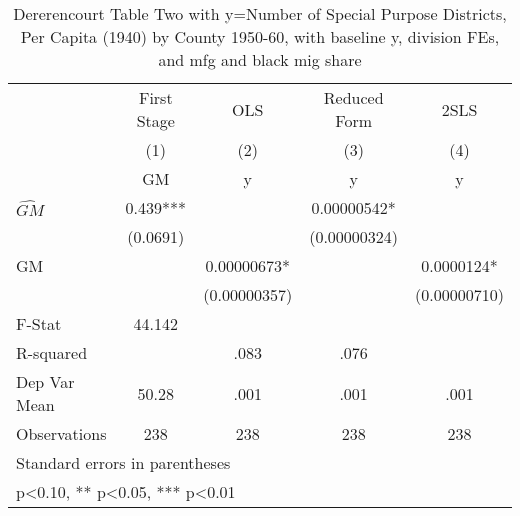 \begin{table}[htbp]\centering
\def\sym#1{\ifmmode^{#1}\else\(^{#1}\)\fi}
\caption{Dererencourt Table Two with y=Number of Special Purpose Districts, Per Capita (1940) by County 1950-60, with baseline y, division FEs, and mfg and black mig share}
\begin{tabular}{l*{4}{c}}
\toprule
                    & First Stage   &         OLS   &Reduced Form   &        2SLS   \\
                    &\multicolumn{1}{c}{(1)}&\multicolumn{1}{c}{(2)}&\multicolumn{1}{c}{(3)}&\multicolumn{1}{c}{(4)}\\
                    &\multicolumn{1}{c}{GM}&\multicolumn{1}{c}{y}&\multicolumn{1}{c}{y}&\multicolumn{1}{c}{y}\\
\midrule
$\hat{GM}$          &       0.439***&               &  0.00000542*  &               \\
                    &    (0.0691)   &               &(0.00000324)   &               \\
\addlinespace
GM                  &               &  0.00000673*  &               &   0.0000124*  \\
                    &               &(0.00000357)   &               &(0.00000710)   \\
\midrule
F-Stat              &      44.142   &               &               &               \\
R-squared           &               &        .083   &        .076   &               \\
Dep Var Mean        &       50.28   &        .001   &        .001   &        .001   \\
Observations        &         238   &         238   &         238   &         238   \\
\bottomrule
\multicolumn{5}{l}{\footnotesize Standard errors in parentheses}\\
\multicolumn{5}{l}{\footnotesize * p<0.10, ** p<0.05, *** p<0.01}\\
\end{tabular}
\end{table}

